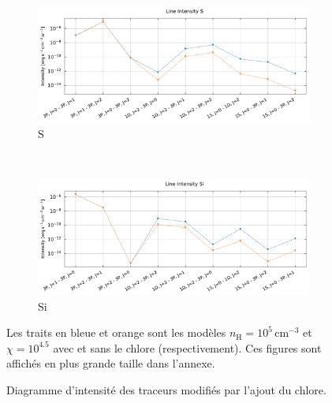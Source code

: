 \begin{figure}[!h]
    \begin{subfigure}[t]{0.49\textwidth} %
        \centering \includegraphics[trim = {0 0 0 1cm},clip,width=1\textwidth]{figure/Cl/gridModelEmiss/I_comp_S.pdf}
        \caption{$\mathrm{S}$}
    \end{subfigure}
    ~
    \begin{subfigure}[t]{0.49\textwidth} %
        \centering \includegraphics[trim = {0 0 0 1cm},clip,width=1\textwidth]{figure/Cl/gridModelEmiss/I_comp_Si.pdf}
        \caption{$\mathrm{Si}$}
    \end{subfigure}
    
    \caption{Diagramme d'intensité des traceurs modifiés par l'ajout du chlore.}
    \begin{minipage}{\textwidth}
    Les traits en bleue et orange sont les modèles $n_\mathrm{H}=10^5 \, \mathrm{cm}^{-3}$ et $\chi=10^{4.5}$ avec et sans le chlore (respectivement). Ces figures sont affichés en plus grande taille dans l'annexe.
    \end{minipage}
    \label{fig:Cl:gridModelEmiss:yes}
\end{figure}




